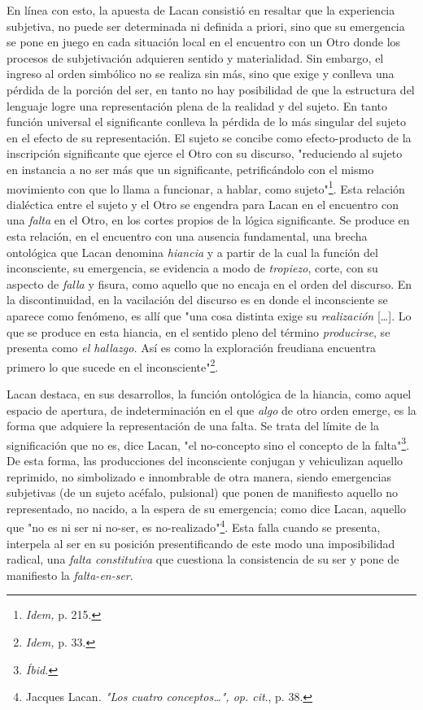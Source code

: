 \documentclass{book}
\begin{document}
En línea con esto, la apuesta de Lacan consistió en resaltar que la
experiencia subjetiva, no puede ser determinada ni definida a priori,
sino que su emergencia se pone en juego en cada situación local en el
encuentro con un Otro donde los procesos de subjetivación adquieren
sentido y materialidad. Sin embargo, el ingreso al orden simbólico no se
realiza sin más, sino que exige y conlleva una pérdida de la porción del
ser, en tanto no hay posibilidad de que la estructura del lenguaje logre
una representación plena de la realidad y del sujeto. En tanto función
universal el significante conlleva la pérdida de lo más singular del
sujeto en el efecto de su representación. El sujeto se concibe como
efecto-producto de la inscripción significante que ejerce el Otro con su
discurso, "reduciendo al sujeto en instancia a no ser más que un
significante, petrificándolo con el mismo movimiento con que lo llama a
funcionar, a hablar, como sujeto"\footnote{\emph{Idem,} p. 215.}. Esta
relación dialéctica entre el sujeto y el Otro se engendra para Lacan en
el encuentro con una \emph{falta} en el Otro, en los cortes propios de
la lógica significante. Se produce en esta relación, en el encuentro con
una ausencia fundamental, una brecha ontológica que Lacan denomina
\emph{hiancia} y a partir de la cual la función del inconsciente, su
emergencia, se evidencia a modo de \emph{tropiezo}, corte, con su
aspecto de \emph{falla} y fisura, como aquello que no encaja en el orden
del discurso. En la discontinuidad, en la vacilación del discurso es en
donde el inconsciente se aparece como fenómeno, es allí que "una cosa
distinta exige su \emph{realización} {[}\ldots{]}. Lo que se produce en
esta hiancia, en el sentido pleno del término \emph{producirse}, se
presenta como \emph{el hallazgo.} Así es como la exploración freudiana
encuentra primero lo que sucede en el inconsciente"\footnote{\emph{Idem,}
  p. 33.}.

Lacan destaca, en sus desarrollos, la función ontológica de la hiancia,
como aquel espacio de apertura, de indeterminación en el que \emph{algo}
de otro orden emerge, es la forma que adquiere la representación de una
falta. Se trata del límite de la significación que no es, dice Lacan,
"el no-concepto sino el concepto de la falta"\footnote{\emph{Íbid.}}. De
esta forma, las producciones del inconsciente conjugan y vehiculizan
aquello reprimido, no simbolizado e innombrable de otra manera, siendo
emergencias subjetivas (de un sujeto acéfalo, pulsional) que ponen de
manifiesto aquello no representado, no nacido, a la espera de su
emergencia; como dice Lacan, aquello que "no es ni ser ni no-ser, es
no-realizado"\footnote{Jacques Lacan\emph{. "Los cuatro
  conceptos\ldots", op. cit}., p. 38.}. Esta falla cuando se presenta,
interpela al ser en su posición presentificando de este modo una
imposibilidad radical, una \emph{falta constitutiva} que cuestiona la
consistencia de su ser y pone de manifiesto la \emph{falta-en-ser}.
\end{document}
